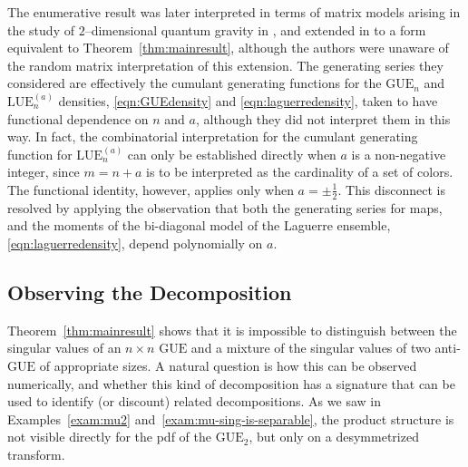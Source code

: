 \documentclass[pdftex, oneside, 10pt, letterpaper]{amsart}
\theoremstyle{plain}
\theoremstyle{definition}
\theoremstyle{remark}
\begin{document}
The enumerative result was later interpreted in terms of matrix models
arising in the study of $2$--dimensional quantum gravity in
\cite{JPV}, and extended in \cite{JV-Eulerian} to a form equivalent to
Theorem~\ref{thm:mainresult}, although the authors were unaware of the
random matrix interpretation of this extension.  The generating series
they considered are effectively the cumulant generating functions for
the ${\ensuremath{\mathrm{GUE}}}{}_n$ and ${\ensuremath{\mathrm{LUE}}}{}_n^{(a)}$ densities, \eqref{eqn:GUEdensity}
and \eqref{eqn:laguerredensity}, taken to have functional dependence
on $n$ and $a$, although they did not interpret them in this way.  In
fact, the combinatorial interpretation for the cumulant generating
function for ${\ensuremath{\mathrm{LUE}}}{}_n^{(a)}$ can only be established directly when
$a$ is a non-negative integer, since $m=n+a$ is to be interpreted as
the cardinality of a set of colors.  The functional identity, however,
applies only when $a=\pm\frac12$.  This disconnect is resolved by
applying the observation that both the generating series for maps, and
the moments of the bi-diagonal model of the Laguerre ensemble,
\eqref{eqn:laguerredensity}, depend polynomially on $a$.

\goodbreak

\subsection{Observing the Decomposition}

Theorem~\ref{thm:mainresult} shows that it is impossible to
distinguish between the singular values of an $n\times{n}$ {\ensuremath{\mathrm{GUE}}}{} and
a mixture of the singular values of two anti-{\ensuremath{\mathrm{GUE}}}{} of appropriate
sizes.  A natural question is how this can be observed numerically,
and whether this kind of decomposition has a signature that can be
used to identify (or discount) related decompositions.  As we saw in
Examples~\ref{exam:mu2} and~\ref{exam:mu-sing-is-separable}, the
product structure is not visible directly for the pdf of the
${\ensuremath{\mathrm{GUE}}}_2$, but only on a desymmetrized transform.
\end{document}
